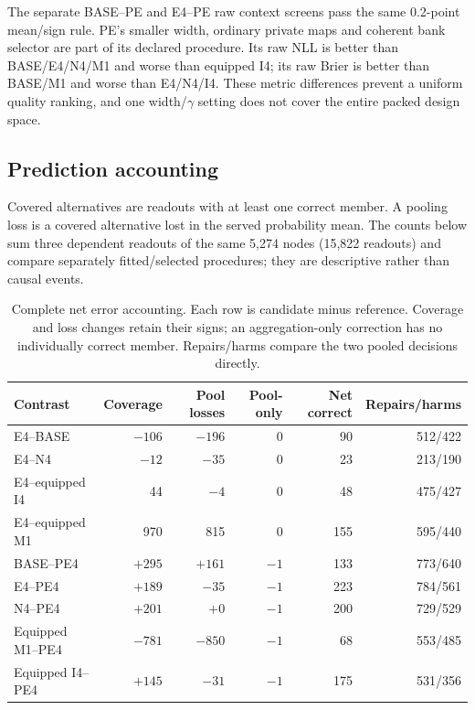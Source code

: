 The separate BASE--PE and E4--PE raw context screens pass the same 0.2-point mean/sign rule. PE's smaller width, ordinary private maps and coherent bank selector are part of its declared procedure. Its raw NLL is better than BASE/E4/N4/M1 and worse than equipped I4; its raw Brier is better than BASE/M1 and worse than E4/N4/I4. These metric differences prevent a uniform quality ranking, and one width/$\gamma$ setting does not cover the entire packed design space.

\subsection{Prediction accounting}
Covered alternatives are readouts with at least one correct member. A pooling loss is a covered alternative lost in the served probability mean. The counts below sum three dependent readouts of the same 5,274 nodes (15,822 readouts) and compare separately fitted/selected procedures; they are descriptive rather than causal events.

\begin{table}[t]
\centering\small\setlength{\tabcolsep}{4pt}
\caption{Complete net error accounting. Each row is candidate minus reference. Coverage and loss changes retain their signs; an aggregation-only correction has no individually correct member. Repairs/harms compare the two pooled decisions directly.}
\label{tab:E-PE-errors}
\begin{tabular}{lrrrrr}
\toprule
Contrast & Coverage & Pool losses & Pool-only & Net correct & Repairs/harms\\
\midrule
E4--BASE & $-106$ & $-196$ & 0 & 90 & 512/422\\
E4--N4 & $-12$ & $-35$ & 0 & 23 & 213/190\\
E4--equipped I4 & 44 & $-4$ & 0 & 48 & 475/427\\
E4--equipped M1 & 970 & 815 & 0 & 155 & 595/440\\
\midrule
BASE--PE4 & $+295$ & $+161$ & $-1$ & 133 & 773/640\\
E4--PE4 & $+189$ & $-35$ & $-1$ & 223 & 784/561\\
N4--PE4 & $+201$ & $+0$ & $-1$ & 200 & 729/529\\
Equipped M1--PE4 & $-781$ & $-850$ & $-1$ & 68 & 553/485\\
Equipped I4--PE4 & $+145$ & $-31$ & $-1$ & 175 & 531/356\\
\bottomrule\end{tabular}\end{table}


